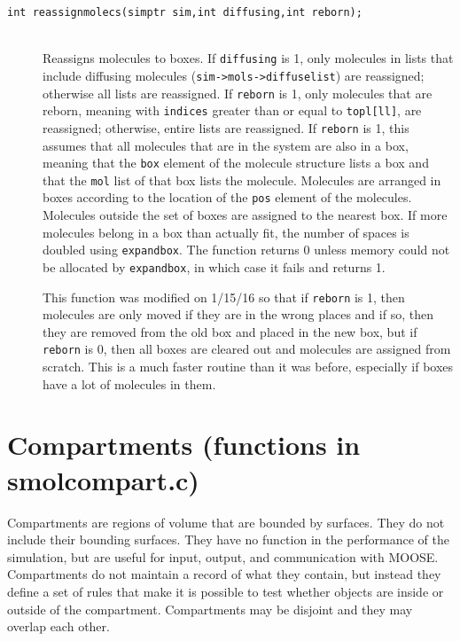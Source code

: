 \documentclass {book}
\begin{document}
\begin{description}
\item[\texttt{int reassignmolecs(simptr sim,int diffusing,int reborn);}]
\hfill \\
Reassigns molecules to boxes.  If \texttt{diffusing} is 1, only molecules in lists that include diffusing molecules (\texttt{sim->mols->diffuselist}) are reassigned; otherwise all lists are reassigned.  If \texttt{reborn} is 1, only molecules that are reborn, meaning with \texttt{indices} greater than or equal to \texttt{topl[ll]}, are reassigned; otherwise, entire lists are reassigned.  If \texttt{reborn} is 1, this assumes that all molecules that are in the system are also in a box, meaning that the \texttt{box} element of the molecule structure lists a box and that the \texttt{mol} list of that box lists the molecule.  Molecules are arranged in boxes according to the location of the \texttt{pos} element of the molecules.  Molecules outside the set of boxes are assigned to the nearest box.  If more molecules belong in a box than actually fit, the number of spaces is doubled using \texttt{expandbox}.  The function returns 0 unless memory could not be allocated by \texttt{expandbox}, in which case it fails and returns 1.

This function was modified on 1/15/16 so that if \texttt{reborn} is 1, then molecules are only moved if they are in the wrong places and if so, then they are removed from the old box and placed in the new box, but if \texttt{reborn} is 0, then all boxes are cleared out and molecules are assigned from scratch.  This is a much faster routine than it was before, especially if boxes have a lot of molecules in them.

\end{description}

\section{Compartments (functions in smolcompart.c)}

Compartments are regions of volume that are bounded by surfaces.  They do not include their bounding surfaces.  They have no function in the performance of the simulation, but are useful for input, output, and communication with MOOSE.  Compartments do not maintain a record of what they contain, but instead they define a set of rules that make it is possible to test whether objects are inside or outside of the compartment.  Compartments may be disjoint and they may overlap each other.
\end{document}
